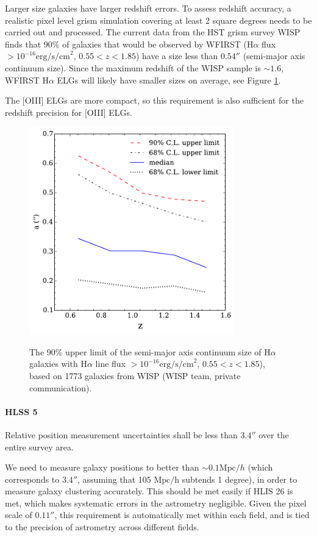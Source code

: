  Larger size galaxies have larger redshift errors. To assess redshift accuracy,
 a realistic pixel level grism simulation covering at least 2 square degrees
 needs to be carried out and processed. The current data from the HST grism
 survey WISP finds that 90\% of galaxies that would be observed by WFIRST
 (H$\alpha$ flux $> 10^{-16} \mathrm{erg/s/cm}^2$, $0.55 < z < 1.85$) have a
 size less than $0.54''$ (semi-major axis continuum size). Since the maximum
 redshift of the WISP sample is $\sim1.6$, WFIRST H$\alpha$ ELGs will likely
 have smaller sizes on average, see Figure \ref{fig:size_zbin}.

 The [OIII] ELGs are more compact, so this requirement is also sufficient for
 the redshift precision for [OIII] ELGs.

\begin{figure}
\includegraphics[width = 3.5in]{Plots/size_zbin.pdf}
\label{fig:size_zbin}
\caption{The 90\% upper limit of the semi-major axis
continuum size of H$\alpha$ galaxies with H$\alpha$ line flux $>10^{-16}
\mathrm{erg/s/cm}^2$, $0.55 < z < 1.85$), based on 1773 galaxies from WISP (WISP
team, private communication).} \end{figure}

\paragraph{HLSS 5} Relative position measurement uncertainties shall be less than $3.4''$ over the entire survey area.

 We need to measure galaxy positions to better than $\sim0.1 \mathrm{Mpc}/h$ (which corresponds to $3.4''$, assuming that 105 $\mathrm{Mpc/h}$ subtends 1 degree), in order to measure galaxy clustering accurately. This should be met easily if HLIS 26 is met, which makes systematic errors in the astrometry negligible. Given the pixel scale of $0.11''$, this requirement is automatically met within each field, and is tied to the precision of astrometry across different fields.

